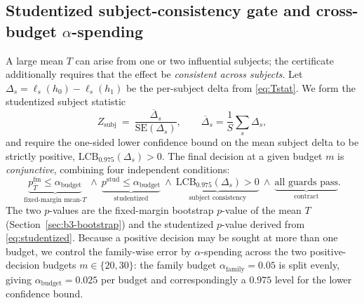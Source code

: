 \subsection{Studentized subject-consistency gate and cross-budget \texorpdfstring{$\alpha$}{alpha}-spending}
\label{sec:b3-decision}
A large mean $T$ can arise from one or two influential subjects; the certificate additionally requires that
the effect be \emph{consistent across subjects}. Let $\Delta_s=\ell_s(h_0)-\ell_s(h_1)$ be the per-subject
delta from \eqref{eq:Tstat}. We form the studentized subject statistic
\begin{equation}
  Z_{\mathrm{subj}}\ =\ \frac{\overline{\Delta}_s}{\mathrm{SE}(\Delta_s)},
  \qquad
  \overline{\Delta}_s=\frac1S\sum_s\Delta_s,
  \label{eq:studentized}
\end{equation}
and require the one-sided lower confidence bound on the mean subject delta to be strictly positive,
$\mathrm{LCB}_{0.975}(\Delta_s)>0$. The final decision at a given budget $m$ is \emph{conjunctive}, combining
four independent conditions:
\begin{equation}
  \underbrace{p^{\text{fm}}_{\bar T}\le\alpha_{\text{budget}}}_{\text{fixed-margin mean-}T}
  \ \wedge\
  \underbrace{p^{\text{stud}}\le\alpha_{\text{budget}}}_{\text{studentized}}
  \ \wedge\
  \underbrace{\mathrm{LCB}_{0.975}(\Delta_s)>0}_{\text{subject consistency}}
  \ \wedge\
  \underbrace{\text{all guards pass}}_{\text{contract}} .
  \label{eq:decision}
\end{equation}
The two $p$-values are the fixed-margin bootstrap $p$-value of the mean $T$ (Section~\ref{sec:b3-bootstrap})
and the studentized $p$-value derived from \eqref{eq:studentized}. Because a positive decision may be sought
at more than one budget, we control the family-wise error by $\alpha$-spending across the two positive-decision
budgets $m\in\{20,30\}$: the family budget $\alpha_{\text{family}}=0.05$ is split evenly, giving
$\alpha_{\text{budget}}=0.025$ per budget and correspondingly a $0.975$ level for the lower confidence bound.
\claimtag{C-b3-test}


